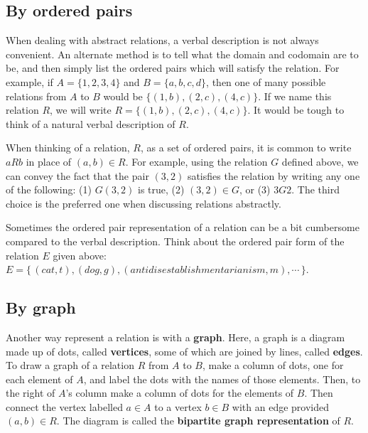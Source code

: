 \subsection{By ordered pairs}
When dealing with abstract relations, a verbal description is not always convenient. An
alternate method is to tell what the domain and codomain are to be, and then simply list 
the ordered pairs which will satisfy the relation.  For example, 
if $A=\{1,2,3,4\}$ and $B=\{a,b,c,d\}$, then one of many possible  relations from $A$ to $B$
would be $\{(1,b),(2,c),(4,c)\}$. If we name this relation $R$, we will write
$R=\{(1,b),(2,c),(4,c)\}$. It would be tough to think of a natural verbal description
of $R$. 

When thinking of a relation, $R$, as a set of ordered pairs, it is common to write
 $aRb$ in place of $(a,b)\in R$.
For example, using the relation $G$ defined above, we can convey the fact that
the pair $(3,2)$ satisfies the relation by writing any one of the following: (1) $G(3,2)$ is true,
(2) $(3,2)\in G$, or (3) $3G2$. The third choice is the preferred one when discussing
relations abstractly.  


Sometimes the  ordered pair representation of a relation can be a bit cumbersome compared to the
verbal description. Think about the ordered pair form of the relation $E$ given above:
$E=\{\,(cat,t), (dog,g), (antidisestablishmentarianism, m), \cdots\,\}$. 

\subsection{By graph}
Another way
represent a relation is with a {\bfseries graph}. Here, a  graph is a diagram made
up of dots, called {\bfseries vertices}, some of which are joined by lines, called 
{\bfseries edges}.  To draw a graph of a relation $R$ from $A$ to $B$, make
a column of dots, one for each element of $A$, and label the dots with the names of those elements. Then, to the right of $A$'s column  make a column of dots
for the elements of $B$. 
Then connect the vertex labelled $a\in A$ to a vertex
$b\in B$ with an edge provided $(a,b)\in R$. 
The diagram  is called the {\bfseries bipartite graph 
representation} of $R$.

